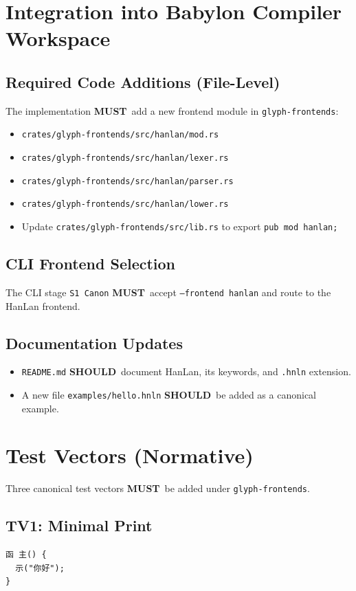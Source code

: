 \documentclass[12pt]{article}
\newcommand{\MUST}{\textbf{MUST}}
\newcommand{\SHOULD}{\textbf{SHOULD}}
\begin{document}
\section{Integration into Babylon Compiler Workspace}
\subsection{Required Code Additions (File-Level)}
The implementation \MUST\ add a new frontend module in \texttt{glyph-frontends}:
\begin{itemize}[leftmargin=1.5em]
  \item \texttt{crates/glyph-frontends/src/hanlan/mod.rs}
  \item \texttt{crates/glyph-frontends/src/hanlan/lexer.rs}
  \item \texttt{crates/glyph-frontends/src/hanlan/parser.rs}
  \item \texttt{crates/glyph-frontends/src/hanlan/lower.rs}
  \item Update \texttt{crates/glyph-frontends/src/lib.rs} to export \texttt{pub mod hanlan;}
\end{itemize}

\subsection{CLI Frontend Selection}
The CLI stage \texttt{S1 Canon} \MUST\ accept \texttt{--frontend hanlan} and route to the HanLan frontend.

\subsection{Documentation Updates}
\begin{itemize}[leftmargin=1.5em]
  \item \texttt{README.md} \SHOULD\ document HanLan, its keywords, and \texttt{.hnln} extension.
  \item A new file \texttt{examples/hello.hnln} \SHOULD\ be added as a canonical example.
\end{itemize}

\section{Test Vectors (Normative)}
Three canonical test vectors \MUST\ be added under \texttt{glyph-frontends}.

\subsection{TV1: Minimal Print}
\begin{verbatim}
函 主() {
  示("你好");
}
\end{verbatim}
\end{document}
